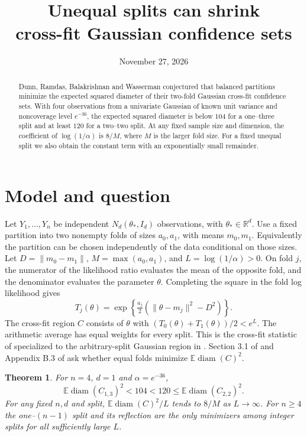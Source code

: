 \documentclass[11pt,a4paper]{amsart}
\title[Unequal splits in cross-fit Gaussian inference]{Unequal splits can shrink\\cross-fit Gaussian confidence sets}
\date{November 27, 2026}
\newtheorem{theorem}{Theorem}
\begin{document}
\begin{abstract}
Dunn, Ramdas, Balakrishnan and Wasserman conjectured that balanced partitions minimize the expected squared diameter of their two-fold Gaussian cross-fit confidence sets. With four observations from a univariate Gaussian of known unit variance and noncoverage level \(e^{-36}\), the expected squared diameter is below \(104\) for a one--three split and at least \(120\) for a two--two split. At any fixed sample size and dimension, the coefficient of \(\log(1/\alpha)\) is \(8/M\), where \(M\) is the larger fold size. For a fixed unequal split we also obtain the constant term with an exponentially small remainder.
\end{abstract}
\maketitle

\section{Model and question}

Let \(Y_1,\ldots,Y_n\) be independent \(N_d(\theta_*,I_d)\) observations, with \(\theta_*\in\mathbb R^d\). Use a fixed partition into two nonempty folds of sizes \(a_0,a_1\), with means \(m_0,m_1\). Equivalently the partition can be chosen independently of the data conditional on those sizes. Let \(D=\|m_0-m_1\|\), \(M=\max(a_0,a_1)\), and \(L=\log(1/\alpha)>0\). On fold \(j\), the numerator of the likelihood ratio evaluates the mean of the opposite fold, and the denominator evaluates the parameter \(\theta\). Completing the square in the fold log likelihood gives
\[
 T_j(\theta)=\exp\left\{\tfrac{a_j}{2}(\|\theta-m_j\|^2-D^2)\right\}.
\]
The cross-fit region \(C\) consists of \(\theta\) with \((T_0(\theta)+T_1(\theta))/2<e^L\). The arithmetic average has equal weights for every split. This is the cross-fit statistic of \cite{wrb} specialized to the arbitrary-split Gaussian region in \cite[\S S4, Eq.~(S28)]{drbwpre}. Section 3.1 of \cite{drbw} and Appendix B.3 of \cite{dunn} ask whether equal folds minimize \(\mathbb E\operatorname{diam}(C)^2\).

\begin{theorem}\label{thm:main}
For \(n=4\), \(d=1\) and \(\alpha=e^{-36}\),
\[
 \mathbb E\operatorname{diam}(C_{1,3})^2<104<120
 \le\mathbb E\operatorname{diam}(C_{2,2})^2 .
\]
For any fixed \(n,d\) and split, \(\mathbb E\operatorname{diam}(C)^2/L\) tends to \(8/M\) as \(L\to\infty\). For \(n\ge4\) the one--\((n-1)\) split and its reflection are the only minimizers among integer splits for all sufficiently large \(L\).
\end{theorem}
\end{document}
